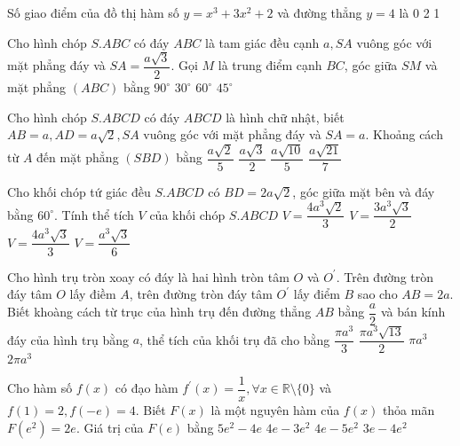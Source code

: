 \begin{ex} %
 Số giao điểm của đồ thị hàm số $y=x^{3}+3 x^{2}+2$ và đường thẳng $y=4$ là
\choice
{0}
{}
{2}
{1}
\end{ex}

\begin{ex} %
 Cho hình chóp $S. A B C$ có đáy $A B C$ là tam giác đều cạnh $a, S A$ vuông góc với mặt phẳng đáy và $S A=\dfrac{a \sqrt{3}}{2}$. Gọi $M$ là trung điểm cạnh $B C$, góc giữa $S M$ và mặt phẳng $(A B C)$ bằng
\choice
{$90^{\circ}$}
{\True $30^{\circ}$}
{$60^{\circ}$}
{$45^{\circ}$}
\end{ex}

\begin{ex} %
 Cho hình chóp $S. A B C D$ có đáy $A B C D$ là hình chữ nhật, biết $A B=a, A D=a \sqrt{2}, S A$ vuông góc với mặt phẳng đáy và $S A=a$. Khoảng cách từ $A$ đến mặt phẳng $(S B D)$ bằng
\choice
{$\dfrac{a \sqrt{2}}{5}$}
{$\dfrac{a \sqrt{3}}{2}$}
{\True $\dfrac{a \sqrt{10}}{5}$}
{$\dfrac{a \sqrt{21}}{7}$}
\end{ex}

\begin{ex} %
 Cho khối chóp tứ giác đều $S. A B C D$ có $B D=2 a \sqrt{2}$, góc giữa mặt bên và đáy bằng $60^{\circ}$. Tính thể tích $V$ của khối chóp $S. A B C D$
\choice
{$V=\dfrac{4 a^{3} \sqrt{2}}{3}$}
{$V=\dfrac{3 a^{3} \sqrt{3}}{2}$}
{$V=\dfrac{4 a^{3} \sqrt{3}}{3}$}
{\True $V=\dfrac{a^{3} \sqrt{3}}{6}$}
\end{ex}

\begin{ex} %
 Cho hình trụ tròn xoay có đáy là hai hình tròn tâm $O$ và $O^{\prime}$. Trên đường tròn đáy tâm $O$ lấy điềm $A$, trên đường tròn đáy tâm $O^{\prime}$ lấy điểm $B$ sao cho $A B=2 a$. Biết khoàng cách từ trục của hình trụ đến đường thẳng $A B$ bằng $\dfrac{a}{2}$ và bán kính đáy của hình trụ bằng $a$, thể tích của khối trụ đã cho bằng
\choice
{$\dfrac{\pi a^{3}}{3}$}
{$\dfrac{\pi a^{3} \sqrt{13}}{2}$}
{\True $\pi a^{3}$}
{$2 \pi a^{3}$}
\end{ex}

\begin{ex} %
 Cho hàm số $f(x)$ có đạo hàm $f^{\prime}(x)=\dfrac{1}{x}, \forall x \in \mathbb{R} \setminus\{0\}$ và $f(1)=2, f(-e)=4$. Biết $F(x)$ là một nguyên hàm của $f(x)$ thỏa mãn $F\left(e^{2}\right)=2 e$. Giá trị của $F(e)$ bằng
\choice
{$5 e^{2}-4 e$}
{\True $4 e-3 e^{2}$}
{$4 e-5 e^{2}$}
{$3 e-4 e^{2}$}
\end{ex}

